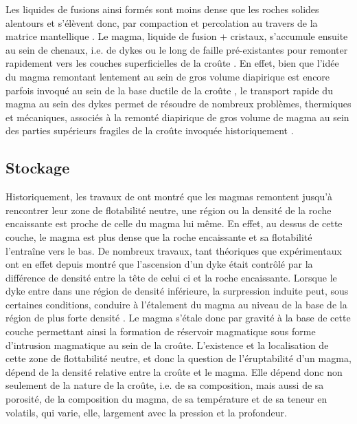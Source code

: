 Les liquides de  fusions ainsi formés sont moins dense  que les roches
solides alentours et s'élèvent donc,  par compaction et percolation au
travers          de           la          matrice          mantellique
\citep{McKenzy:1984bo,McKenzie:1985jq}. Le magma,  liquide de fusion +
cristaux, s'accumule ensuite au sein de  chenaux, i.e.  de dykes ou le
long  de  faille  pré-existantes  pour remonter  rapidement  vers  les
couches          superficielles          de         la          croûte
\citep{Lister:1991ut,Clemens:1992kr,Petford:1993bk,Rubin:1995upa}.  En
effet, bien  que l'idée du magma  remontant lentement au sein  de gros
volume  diapirique est  encore  parfois  invoqué au  sein  de la  base
ductile  de  la   croûte  \citep{Weinberg:1994jg,Weinberg:1996vb},  le
transport rapide  du magma  au sein  des dykes  permet de  résoudre de
nombreux problèmes,  thermiques et  mécaniques, associés à  la remonté
diapirique  de gros  volume de  magma au  sein des  parties supérieurs
fragiles de la croûte invoquée historiquement \citep{Miller:1999km}.

\subsection{Stockage}
\label{sec:stockage}

Historiquement, les  travaux de  \citet{Walker:1989jq} ont  montré que
les  magmas  remontent jusqu'à  rencontrer  leur  zone de  flotabilité
neutre, une région ou la densité de la roche encaissante est proche de
celle du magma lui même. En effet, au dessus de cette couche, le magma
est plus dense  que la roche encaissante et  sa flotabilité l'entraîne
vers    le    bas.     De   nombreux    travaux,    tant    théoriques
\citep{Lister:1991ut,Petford:1993bk,Rubin:1995upa}  que  expérimentaux
\citep{Taisne:2009kj,Taisne:2011do}  ont en  effet  depuis montré  que
l'ascension  d'un dyke  était contrôlé  par la  différence de  densité
entre la  tête de celui  ci et la  roche encaissante. Lorsque  le dyke
entre dans  une région de  densité inférieure, la  surpression induite
peut, sous  certaines conditions, conduire  à l'étalement du  magma au
niveau   de   la  base   de   la   région   de  plus   forte   densité
\citep{Taisne:2011do}. Le magma s'étale donc  par gravité à la base de
cette  couche permettant  ainsi la  formation de  réservoir magmatique
sous forme d'intrusion magmatique au sein de la croûte. L’existence et
la  localisation de  cette zone  de  flottabilité neutre,  et donc  la
question de l'éruptabilité  d'un magma, dépend de  la densité relative
entre la  croûte et le  magma.  Elle dépend  donc non seulement  de la
nature  de la  croûte,  i.e.   de sa  composition,  mais  aussi de  sa
porosité,  de la  composition du  magma, de  sa température  et de  sa
teneur en volatils, qui varie, elle,  largement avec la pression et la
profondeur.

